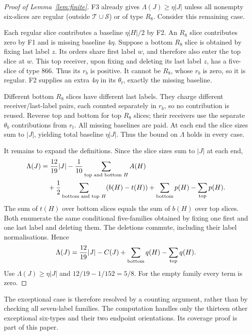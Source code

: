 \documentclass[11pt,letterpaper]{article}
\theoremstyle{definition}
\begin{document}
\begin{proof}[Proof of Lemma~\ref{lem:finite}]
F3 already gives \(\Lambda(J)\geq\eta|J|\) unless all nonempty
six-slices are regular (outside \(\mathcal T\cup\mathcal S\)) or
of type \(R_8\). Consider this remaining case.

Each regular slice contributes a baseline \(\eta|H|/2\) by F2.
An \(R_8\) slice contributes zero by F1 and is missing baseline
\(4\eta\). Suppose a bottom \(R_8\) slice is obtained by fixing
last label \(z\). Its orders share first label \(w\), and therefore
also enter the top slice at \(w\). This top receiver, upon fixing
and deleting its last label \(z\), has a five-slice of type 866.
Thus its \(r_b\) is positive. It cannot be \(R_8\), whose \(r_b\)
is zero, so it is regular. F2 supplies an extra \(4\eta\) in its
\(\theta_t\), exactly the missing baseline.

Different bottom \(R_8\) slices have different last labels. They
charge different receiver/last-label pairs, each counted separately
in \(r_b\), so no contribution is reused. Reverse top and bottom
for top \(R_8\) slices; their receivers use the separate
\(\theta_b\) contributions from \(r_t\). All missing baselines
are paid. At each end the slice sizes sum to \(|J|\), yielding
total baseline \(\eta|J|\). Thus the bound on \(\Lambda\) holds
in every case.

It remains to expand the definitions. Since the slice sizes sum to
\(|J|\) at each end,
\begin{align*}
 \Lambda(J)
 &=\frac{12}{19}|J|-\frac1{10}
       \sum_{\text{top and bottom }H}A(H)\\
 &\quad+\frac12\sum_{\text{bottom and top }H}(b(H)-t(H))
       +\sum_{\rm bottom}p(H)-\sum_{\rm top}p(H).
\end{align*}
The sum of \(t(H)\) over bottom slices equals the sum of \(b(H)\)
over top slices. Both enumerate the same conditional five-families
obtained by fixing one first and one last label and deleting them.
The deletions commute, including their label normalisations. Hence
\[
 \Lambda(J)=\frac{12}{19}|J|-C(J)
       +\sum_{\rm bottom}q(H)-\sum_{\rm top}q(H).
\]
Use \(\Lambda(J)\geq\eta|J|\) and
\(12/19-1/152=5/8\). For the empty family every term is zero.
\end{proof}

The exceptional case is therefore resolved by a counting argument,
rather than by checking all seven-label families. The computation
handles only the thirteen other exceptional six-types and their two
endpoint orientations. Its coverage proof is part of this paper.
\end{document}
